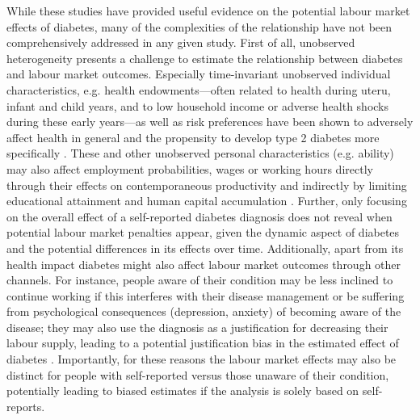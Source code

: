 While these studies have provided useful evidence on the potential labour market effects of diabetes, many of the complexities of the relationship have not been comprehensively addressed in any given study. First of all, unobserved heterogeneity presents a challenge to estimate the relationship between diabetes and labour market outcomes. Especially time-invariant unobserved individual characteristics, e.g. health endowments---often related to health during uteru, infant and child years, and to low household income or adverse health shocks during these early years---as well as risk preferences have been shown to adversely affect health in general and the propensity to develop type 2 diabetes more specifically \parencite{VanEwijk2011,Sotomayor2013,Li2010b}. These and other unobserved personal characteristics (e.g. ability) may also affect employment probabilities, wages or working hours directly through their effects on contemporaneous productivity \parencite{Currie2013} and indirectly by limiting educational attainment and human capital accumulation \parencite{Ayyagari2011a}. Further, only focusing on the overall effect of a self-reported diabetes diagnosis does not reveal when potential labour market penalties appear, given the dynamic aspect of diabetes and the potential differences in its effects over time. Additionally, apart from its health impact diabetes might also affect labour market outcomes through other channels. For instance, people aware of their condition may be less inclined to continue working if this interferes with their disease management or be suffering from psychological consequences (depression, anxiety) of becoming aware of the disease; they may also use the diagnosis as a justification for decreasing their labour supply, leading to a potential justification bias in the estimated effect of diabetes \parencite{Kapteyn2009}. Importantly, for these reasons the labour market effects may also be distinct for people with self-reported versus those unaware of their condition, potentially leading to biased estimates if the analysis is solely based on self-reports.

